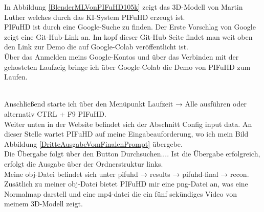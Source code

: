 In Abbildung \ref{BlenderMLVonPIFuHD105k} zeigt das 3D-Modell von Martin Luther welches durch das KI-System PIFuHD erzeugt ist.
\\
PIFuHD ist durch eine Google-Suche zu finden. Der Erste Vorschlag von Google zeigt eine Git-Hub-Link an. Im kopf dieser Git-Hub Seite findet man weit oben den Link zur Demo die auf Google-Colab veröffentlicht ist.
\\
Über das Anmelden meins Google-Kontos und über das Verbinden mit der gehosteten Laufzeig bringe ich über Google-Colab die Demo von PIFuHD zum Laufen.

\\
Anschließend starte ich über den Menüpunkt Laufzeit → Alle ausführen oder alternativ CTRL + F9 PIFuHD.
\\
Weiter unten in der Website befindet sich der Abschnitt Config input data. An dieser Stelle wartet PIFuHD auf meine Eingabeauforderung, wo ich mein Bild Abbildung \ref{DritteAusgabeVomFinalenPrompt} übergebe.
\\
Die Übergabe folgt über den Button Durchsuchen.... Ist die Übergabe erfolgreich, erfolgt die Ausgabe über der Ordnerstruktur links.
\\
Meine obj-Datei befindet sich unter pifuhd → results → pifuhd-final → recon. Zusätlich zu meiner obj-Datei bietet PIFuHD mir eine png-Datei an, was eine Normalmap darstell und eine mp4-datei die ein fünf sekündiges Video von meinem 3D-Modell zeigt.
\\

